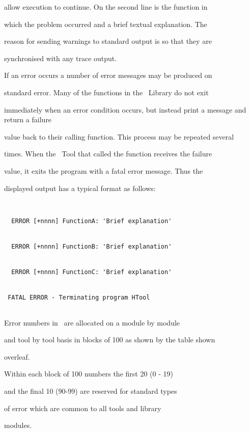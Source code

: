 allow execution to continue.  On the second line is the function in


which the problem occurred and a brief textual explanation.  The


reason for sending warnings to standard output is so that they are


synchronised with any trace output.





If an error occurs a number of error messages may be produced on


standard error. Many of the functions in the \HTK\ Library do not exit


immediately when an error condition occurs, but instead print a message and return a failure


value back to their calling function. This process may be repeated several


times. When the \HTK\ Tool that called the function receives the failure


value, it exits the program with a fatal error message. Thus the


displayed output has a typical format as follows:





\begin{verbatim}


  ERROR [+nnnn] FunctionA: 'Brief explanation'


  ERROR [+nnnn] FunctionB: 'Brief explanation'


  ERROR [+nnnn] FunctionC: 'Brief explanation'


 FATAL ERROR - Terminating program HTool


\end{verbatim}





Error numbers in \HTK\ are allocated on a module by module


and tool by tool basis in blocks of 100 as shown by the table shown


overleaf.


Within each block of 100 numbers the first 20 (0 - 19)


and the final 10 (90-99) are reserved for standard types 


of error which are common to all tools and library 


modules.





